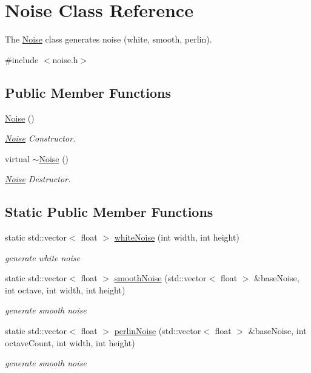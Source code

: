 \hypertarget{class_noise}{}\section{Noise Class Reference}
\label{class_noise}


The \hyperlink{class_noise}{Noise} class generates noise (white, smooth, perlin).  




{\ttfamily \#include $<$noise.\+h$>$}

\subsection*{Public Member Functions}
\begin{DoxyCompactItemize}
\item 
\hyperlink{class_noise_a875a47574d1c86c793296b542e7de9f3}{Noise} ()
\begin{DoxyCompactList}\small\item\em \hyperlink{class_noise}{Noise} Constructor. \end{DoxyCompactList}\item 
\mbox{\label{class_noise_a751f1c229c801b0abd4a84f8bf08d810}} 
virtual \hyperlink{class_noise_a751f1c229c801b0abd4a84f8bf08d810}{$\sim$\+Noise} ()
\begin{DoxyCompactList}\small\item\em \hyperlink{class_noise}{Noise} Destructor. \end{DoxyCompactList}\end{DoxyCompactItemize}
\subsection*{Static Public Member Functions}
\begin{DoxyCompactItemize}
\item 
static std\+::vector$<$ float $>$ \hyperlink{class_noise_a3056ac12af3678b375a21c684a406f86}{white\+Noise} (int width, int height)
\begin{DoxyCompactList}\small\item\em generate white noise \end{DoxyCompactList}\item 
static std\+::vector$<$ float $>$ \hyperlink{class_noise_a321a9943200da195340c920287f724d8}{smooth\+Noise} (std\+::vector$<$ float $>$ \&base\+Noise, int octave, int width, int height)
\begin{DoxyCompactList}\small\item\em generate smooth noise \end{DoxyCompactList}\item 
static std\+::vector$<$ float $>$ \hyperlink{class_noise_aa889cc8a2f25fbf1a98a1eaeef7288cb}{perlin\+Noise} (std\+::vector$<$ float $>$ \&base\+Noise, int octave\+Count, int width, int height)
\begin{DoxyCompactList}\small\item\em generate smooth noise \end{DoxyCompactList}\end{DoxyCompactItemize}


